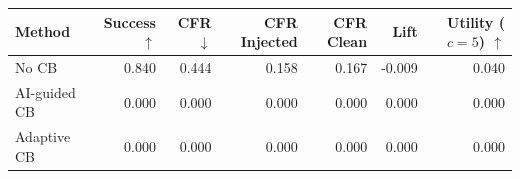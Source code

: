 \begin{tabular}{lrrrrrr}
\toprule
Method & Success $\uparrow$ & CFR $\downarrow$ & CFR Injected & CFR Clean & Lift & Utility ($c=5$) $\uparrow$ \\
\midrule
No CB & 0.840 & 0.444 & 0.158 & 0.167 & -0.009 & 0.040 \\
AI-guided CB & 0.000 & 0.000 & 0.000 & 0.000 & 0.000 & 0.000 \\
Adaptive CB & 0.000 & 0.000 & 0.000 & 0.000 & 0.000 & 0.000 \\
\bottomrule
\end{tabular}
